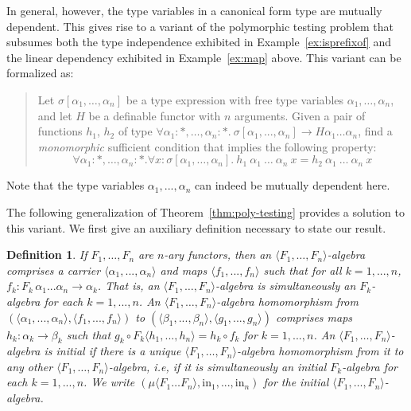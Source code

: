 \documentclass{article}[12 pt]
\newtheorem{definition}{Definition}
\theoremstyle{problemstyle}
\begin{document}
In general, however, the type variables in a canonical form type are
mutually dependent. This gives rise to a variant of the polymorphic
testing problem that subsumes both the type independence exhibited in
Example~\ref{ex:isprefixof} and the linear dependency exhibited in
Example~\ref{ex:map} above. This variant can be formalized as:

\begin{verse}
\hspace*{0.2in}Let $\sigma[\alpha_1,\dots,\alpha_n]$ be a type
expression with free type variables $\alpha_1,\dots,\alpha_n$, and let
$H$ be a definable functor with $n$ arguments. Given a pair of
functions $h_1$, $h_2$ of type $\forall \alpha_1 : *, \dots, \alpha_n
: *.~\sigma[\alpha_1,...,\alpha_n] \to H\alpha_1\dots\alpha_n$, find a
\emph{monomorphic} sufficient condition that implies the following
property:
  \begin{equation}
    \label{eq:problem-constraints}    
  \forall \alpha_1 : *,\dots,\alpha_n : *. \forall x :
  \sigma[\alpha_1,\dots,\alpha_n].~h_1~\alpha_1~\dots~\alpha_n~x =
  h_2~\alpha_1~\dots~\alpha_n~x
  \end{equation}
\end{verse}
\noindent
Note that the type variables $\alpha_1,...,\alpha_n$ can indeed be
mutually dependent here. 

The following generalization of Theorem~\ref{thm:poly-testing}
provides a solution to this variant. We first give an auxiliary
definition necessary to state our result.

\begin{definition}
If $F_1,\dots,F_n$ are $n$-ary functors, then an {\em $\langle
  F_1,\dots,F_n \rangle$-algebra} comprises a carrier $\langle
\alpha_1,...,\alpha_n \rangle$ and maps $\langle f_1,...,f_n \rangle$
such that for all $k = 1,...,n$, $f_k : F_k \,\alpha_1...\alpha_n \to
\alpha_k$. That is, an $\langle F_1,\dots,F_n \rangle$-algebra is
simultaneously an $F_k$-algebra for each $k = 1,...,n$.  An {\em
  $\langle F_1,\dots,F_n \rangle$-algebra homomorphism} from $(\langle
\alpha_1,...,\alpha_n \rangle, \langle f_1,...,f_n \rangle)$ to
$(\langle \beta_1,...,\beta_n \rangle, \langle g_1,...,g_n \rangle)$
comprises maps $h_k : \alpha_k \to \beta_k$ such that $g_k \circ F_k
\langle h_1,...,h_n \rangle = h_k \circ f_k$ for $k = 1,...,n$. An
$\langle F_1,\dots,F_n \rangle$-algebra is {\em initial} if there is a
unique $\langle F_1,\dots,F_n \rangle$-algebra homomorphism from it to
any other $\langle F_1,\dots,F_n \rangle$-algebra, i.e, if it is
simultaneously an initial $F_k$-algebra for each $k = 1,...,n$.  We
write $(\mu \langle F_1 \dots F_n \rangle,
\mathrm{in}_1,...,\mathrm{in}_n)$ for the initial $\langle
F_1,\dots,F_n \rangle$-algebra.
\end{definition}
\end{document}
